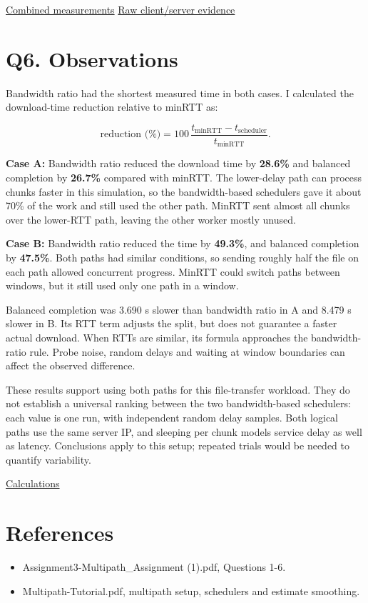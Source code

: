 \documentclass[11pt,a4paper]{article}
\begin{document}
\href{../results/q5/q5-20261017/summary.csv}{Combined measurements} \textperiodcentered{}
\href{../results/q5/q5-20261017/README.md}{Raw client/server evidence}


\section*{Q6. Observations}

Bandwidth ratio had the shortest measured time in both cases. I calculated the
download-time reduction relative to minRTT as:


\[
\text{reduction (\%)}=100\,\frac{t_{\mathrm{minRTT}}-t_{\mathrm{scheduler}}}{t_{\mathrm{minRTT}}}.
\]

\textbf{Case A:} Bandwidth ratio reduced the download time by \textbf{28.6\%} and balanced
completion by \textbf{26.7\%} compared with minRTT. The lower-delay path can process
chunks faster in this simulation, so the bandwidth-based schedulers gave it about
70\% of the work and still used the other path. MinRTT sent almost all chunks over
the lower-RTT path, leaving the other worker mostly unused.


\textbf{Case B:} Bandwidth ratio reduced the time by \textbf{49.3\%}, and balanced completion by
\textbf{47.5\%}. Both paths had similar conditions, so sending roughly half the file on
each path allowed concurrent progress. MinRTT could switch paths between windows,
but it still used only one path in a window.


Balanced completion was 3.690 s slower than bandwidth ratio in A and 8.479 s slower
in B. Its RTT term adjusts the split, but does not guarantee a faster actual download.
When RTTs are similar, its formula approaches the bandwidth-ratio rule. Probe noise,
random delays and waiting at window boundaries can affect the observed difference.


These results support using both paths for this file-transfer workload. They do not
establish a universal ranking between the two bandwidth-based schedulers: each value
is one run, with independent random delay samples. Both logical paths use the same
server IP, and sleeping per chunk models service delay as well as latency. Conclusions
apply to this setup; repeated trials would be needed to quantify variability.


\href{../results/q6/comparison.json}{Calculations}


\section*{References}

\begin{itemize}
\item Assignment3-Multipath\_Assignment (1).pdf, Questions 1-6.
\item Multipath-Tutorial.pdf, multipath setup, schedulers and estimate smoothing.
\end{itemize}
\end{document}
